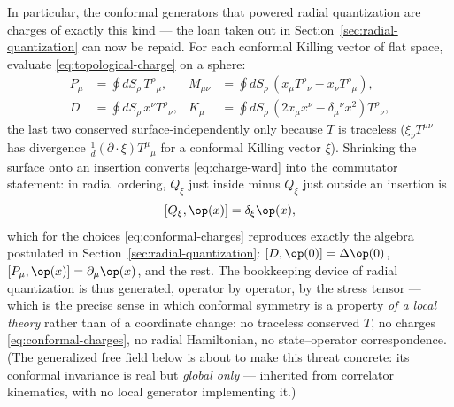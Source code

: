 In particular, the conformal generators that powered radial quantization are
charges of exactly this kind --- the loan taken out in
Section~\ref{sec:radial-quantization} can now be repaid. For each conformal
Killing vector of flat space, evaluate \eqref{eq:topological-charge} on a
sphere:
\begin{equation}
\begin{aligned}
P_\mu &= \oint dS_\rho\, T^{\rho}{}_{\mu}, &
M_{\mu\nu} &= \oint dS_\rho\, \left(x_\mu T^{\rho}{}_{\nu} - x_\nu
T^{\rho}{}_{\mu}\right), \\
D &= \oint dS_\rho\, x^\nu T^{\rho}{}_{\nu}, &
K_\mu &= \oint dS_\rho\, \left(2 x_\mu x^\nu - \delta_\mu{}^{\nu}
x^2\right) T^{\rho}{}_{\nu},
\end{aligned}
\label{eq:conformal-charges}
\end{equation}
the last two conserved surface-independently only because $T$ is traceless
($\xi_\nu T^{\mu\nu}$ has divergence $\tfrac1d (\partial\cdot\xi)
T^\mu{}_\mu$ for a conformal Killing vector $\xi$). Shrinking the surface
onto an insertion converts \eqref{eq:charge-ward} into the commutator
statement: in radial ordering, $Q_\xi$ just inside minus $Q_\xi$ just
outside an insertion is
\begin{equation}
\left[ Q_\xi, \op(x)\right] = \delta_\xi \op(x),
\label{eq:charge-commutator}
\end{equation}
which for the choices \eqref{eq:conformal-charges} reproduces exactly the
algebra postulated in Section~\ref{sec:radial-quantization}: $[D, \op(0)] =
\Delta\op(0)$, $[P_\mu, \op(x)] = \partial_\mu\op(x)$, and the rest. The
bookkeeping device of radial quantization is thus generated, operator by
operator, by the stress tensor --- which is the precise sense in which
conformal symmetry is a property \emph{of a local theory} rather than of a
coordinate change: no traceless conserved $T$, no charges
\eqref{eq:conformal-charges}, no radial Hamiltonian, no state--operator
correspondence. (The generalized free field below is about to make this
threat concrete: its conformal invariance is real but \emph{global only} ---
inherited from correlator kinematics, with no local generator implementing
it.)

